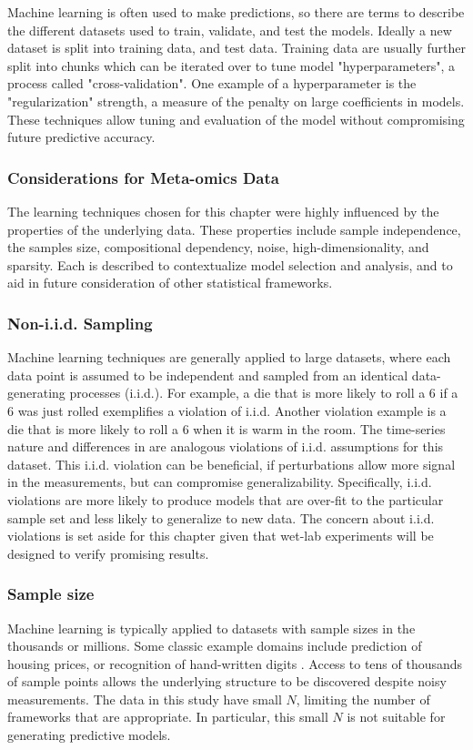 Machine learning is often used to make predictions, so there are terms to describe the different datasets used to train, validate, and test the models.
Ideally a new dataset is split into training data, and test data.
Training data are usually further split into chunks which can be iterated over to tune model "hyperparameters", a process called "cross-validation".
One example of a hyperparameter is the "regularization" strength, a measure of the penalty on large coefficients in models. %
These techniques allow tuning and evaluation of the model without compromising future predictive accuracy.

\subsubsection{Considerations for Meta-omics Data}

The learning techniques chosen for this chapter were highly influenced by the properties of the underlying data.
These properties include sample independence, the samples size, compositional dependency, noise, high-dimensionality, and sparsity.
Each is described to contextualize model selection and analysis, and to aid in future consideration of other statistical frameworks.

\subsubsection{Non-i.i.d. Sampling}
Machine learning techniques are generally applied to large datasets, where each data point is assumed to be independent and sampled from an identical data-generating processes (i.i.d.).
For example, a die that is more likely to roll a 6 if a 6 was just rolled exemplifies a violation of i.i.d.
Another violation example is a die that is more likely to roll a 6 when it is warm in the room.
The time-series nature and differences in  are analogous violations of i.i.d. assumptions for this dataset.
This i.i.d. violation can be beneficial, if perturbations allow more signal in the measurements, but can compromise generalizability.
Specifically, i.i.d. violations are more likely to produce models that are over-fit to the particular sample set and less likely to generalize to new data.
The concern about i.i.d. violations is set aside for this chapter given that wet-lab experiments will be designed to verify promising results.

\subsubsection{Sample size}
Machine learning is typically applied to datasets with sample sizes in the thousands or millions.
Some classic example domains include prediction of housing prices, or recognition of hand-written digits \cite{friedman2001}.
Access to tens of thousands of sample points allows the underlying structure to be discovered despite noisy measurements.
The data in this study have small $N$, limiting the number of frameworks that are appropriate.
In particular, this small $N$ is not suitable for generating predictive models.


